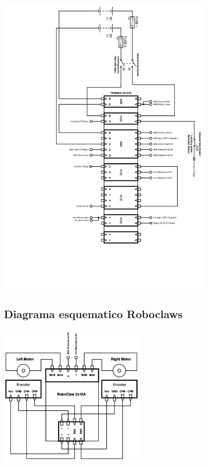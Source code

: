 \documentclass[a4paper,usenames,dvipsnames,svgnames,table]{book}
\begin{document}
\begin{center}
\includegraphics[width=0.8\textwidth]{Figures/Hardware/Esquematicos/JustinaWiringDiagram.jpg}
\label{fig:Hardware:Partes:Diagrama:Esquematico:General}
\end{center}

\subsection{Diagrama esquematico Roboclaws}

\begin{center}
\includegraphics[width=0.55\textwidth]{Figures/Hardware/Esquematicos/Roboclaw_1.png}
\label{fig:Hardware:Partes:Diagrama:Esquematico:Roboclaw:1}
\end{center}
\end{document}
